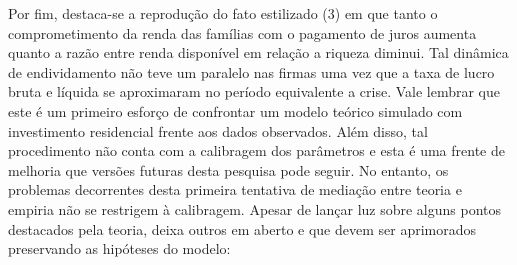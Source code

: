 Por fim, destaca-se a reprodução do fato estilizado (3) em que tanto o comprometimento da renda das famílias com o pagamento de juros aumenta quanto a razão entre renda disponível em relação a riqueza diminui. Tal dinâmica de endividamento não teve um paralelo nas firmas uma vez que a taxa de lucro bruta e líquida se aproximaram no período equivalente a crise. 
Vale lembrar que este é um primeiro esforço de confrontar um modelo teórico simulado com investimento residencial frente aos dados observados.
Além disso, tal procedimento não conta com a calibragem dos parâmetros e esta é uma frente de melhoria que versões futuras desta pesquisa pode seguir.
No entanto, os problemas decorrentes desta primeira tentativa de mediação entre teoria e empiria não se restrigem à calibragem. 
Apesar de lançar luz sobre alguns pontos destacados pela teoria, deixa outros em aberto e que devem ser aprimorados preservando as hipóteses do modelo:
